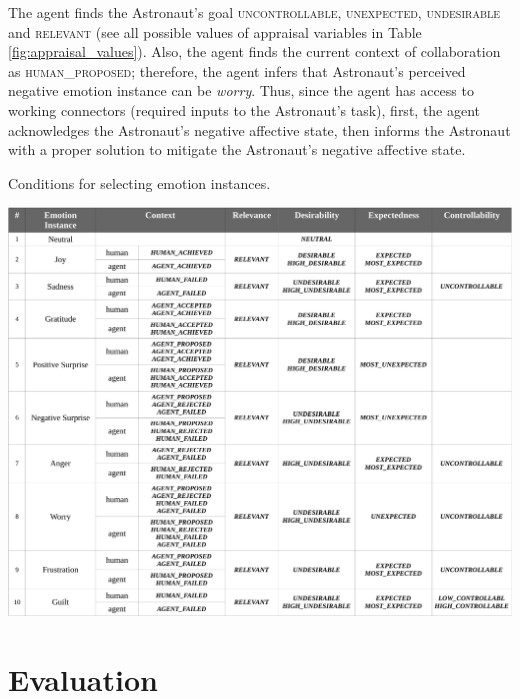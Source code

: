 \documentclass[12pt]{report}
\begin{document}
The agent finds the Astronaut's goal \textsc{uncontrollable},
\textsc{unexpected}, \textsc{undesirable} and \textsc{relevant} (see all
possible values of appraisal variables in Table \ref{fig:appraisal_values}).
Also, the agent finds the current context of collaboration as
\textsc{human\_proposed}; therefore, the agent infers that Astronaut's
perceived negative emotion instance can be \textit{worry}. Thus, since the agent
has access to working connectors (required inputs to the Astronaut's task),
first, the agent acknowledges the Astronaut's negative affective state, then
informs the Astronaut with a proper solution to mitigate the Astronaut's
negative affective state.


\begin{table}
  \centering
  \caption{Conditions for selecting emotion instances.}
  \label{fig:emotion_elicitation}
  \includegraphics[width=1\textwidth]{figure/emotion_elicitation_croped.pdf}
\end{table}

\chapter{Evaluation}
\label{ch:awareness}
\end{document}
